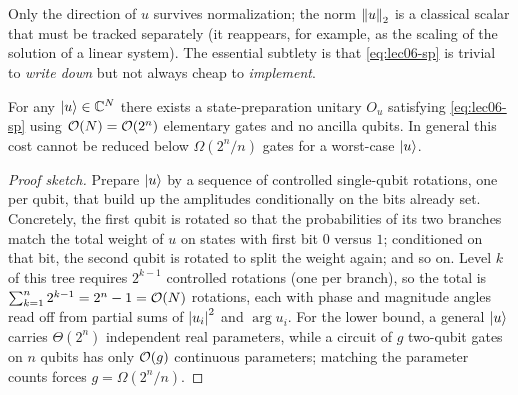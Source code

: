 Only the direction of $u$ survives normalization; the norm $\left\lVert u \right\rVert_2$ is a
classical scalar that must be tracked separately (it reappears, for example, as the
scaling of the solution of a linear system). The essential subtlety is that
\eqref{eq:lec06-sp} is trivial to \emph{write down} but not always cheap to
\emph{implement}.

\begin{proposition}
\label{prop:lec06-sp}
For any $\ket{u}\in\mathbb{C}^{N}$ there exists a state-preparation unitary $O_u$
satisfying \eqref{eq:lec06-sp} using $\mathcal{O}(N)=\mathcal{O}(2^n)$ elementary gates and no
ancilla qubits. In general this cost cannot be reduced below $\Omega(2^n/n)$ gates
for a worst-case $\ket{u}$.
\end{proposition}

\begin{proof}[Proof sketch]
Prepare $\ket{u}$ by a sequence of controlled single-qubit rotations, one per qubit,
that build up the amplitudes conditionally on the bits already set. Concretely, the
first qubit is rotated so that the probabilities of its two branches match the total
weight of $u$ on states with first bit $0$ versus $1$; conditioned on that bit, the
second qubit is rotated to split the weight again; and so on. Level $k$ of this tree
requires $2^{k-1}$ controlled rotations (one per branch), so the total is
$\sum_{k=1}^{n}2^{k-1}=2^{n}-1=\mathcal{O}(N)$ rotations, each with phase and magnitude
angles read off from partial sums of $\left\lvert u_i \right\rvert^2$ and $\arg u_i$. For the lower
bound, a general $\ket{u}$ carries $\Theta(2^n)$ independent real parameters, while a
circuit of $g$ two-qubit gates on $n$ qubits has only $\mathcal{O}(g)$ continuous
parameters; matching the parameter counts forces $g=\Omega(2^n/n)$.
\end{proof}

